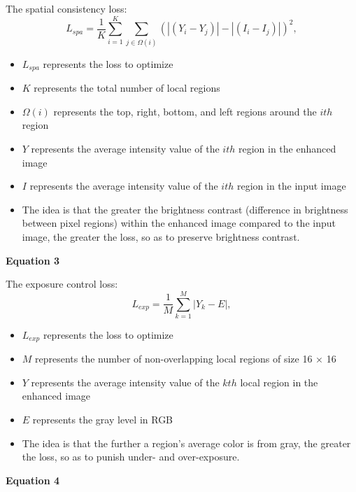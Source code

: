 \documentclass[11pt, letterpaper]{article}
\begin{document}
The spatial consistency loss:
\begin{equation*} 
L_{spa}=\frac{1}{K}\sum \limits _{i=1}^K\sum \limits _{j\in \Omega (i)}(|(Y_{i}-Y_{j})|-|(I_{i}-I_{j})|)^2, \end{equation*}
\begin{itemize}
  \item $L_{spa}$ represents the loss to optimize
  \item $K$ represents the total number of local regions
  \item $\Omega(i)$ represents the top, right, bottom, and left regions around the $ith$ region
  \item $Y$ represents the average intensity value of the $ith$ region in the enhanced image
  \item $I$ represents the average intensity value of the $ith$ region in the input image
  \item The idea is that the greater the brightness contrast (difference in brightness between pixel regions) within the enhanced image compared to the input image, the greater the loss, so as to preserve brightness contrast.
\end{itemize}

\textbf{Equation 3}

The exposure control loss:
\begin{equation*} 
L_{exp}=\frac{1}{M}\sum \limits _{k=1}^M|Y_{k}-E|, \end{equation*}
\begin{itemize}
  \item $L_{exp}$ represents the loss to optimize
  \item $M$ represents the number of non-overlapping local regions of size 16 × 16
  \item $Y$ represents the average intensity value of the $kth$ local region in the enhanced image
  \item $E$ represents the gray level in RGB
  \item The idea is that the further a region's average color is from gray, the greater the loss, so as to punish under- and over-exposure.
\end{itemize}

\textbf{Equation 4}
\end{document}
